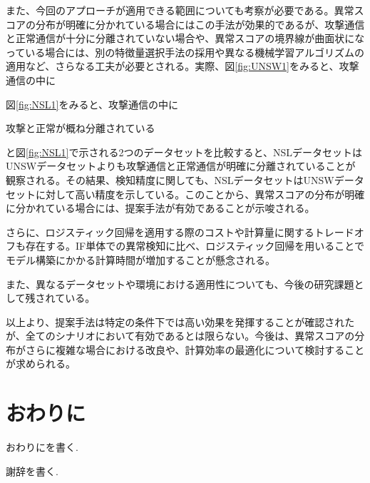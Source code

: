 \documentclass{css}
\begin{document}
また、今回のアプローチが適用できる範囲についても考察が必要である。異常スコアの分布が明確に分かれている場合にはこの手法が効果的であるが、攻撃通信と正常通信が十分に分離されていない場合や、異常スコアの境界線が曲面状になっている場合には、別の特徴量選択手法の採用や異なる機械学習アルゴリズムの適用など、さらなる工夫が必要とされる。実際、図\ref{fig:UNSW1}をみると、攻撃通信の中に

図\ref{fig:NSL1}をみると、攻撃通信の中に

攻撃と正常が概ね分離されている

と図\ref{fig:NSL1}で示される2つのデータセットを比較すると、NSLデータセットはUNSWデータセットよりも攻撃通信と正常通信が明確に分離されていることが観察される。その結果、検知精度に関しても、NSLデータセットはUNSWデータセットに対して高い精度を示している。このことから、異常スコアの分布が明確に分かれている場合には、提案手法が有効であることが示唆される。

さらに、ロジスティック回帰を適用する際のコストや計算量に関するトレードオフも存在する。IF単体での異常検知に比べ、ロジスティック回帰を用いることでモデル構築にかかる計算時間が増加することが懸念される。


また、異なるデータセットや環境における適用性についても、今後の研究課題として残されている。

以上より、提案手法は特定の条件下では高い効果を発揮することが確認されたが、全てのシナリオにおいて有効であるとは限らない。今後は、異常スコアの分布がさらに複雑な場合における改良や、計算効率の最適化について検討することが求められる。

\section{おわりに}
おわりにを書く.

\begin{acknowledgment}
謝辞を書く.\cite{AbuAlghanam2023-sx}
\end{acknowledgment}



\end{document}
